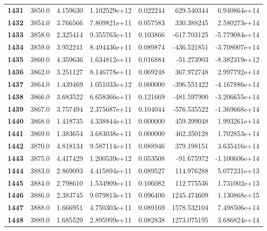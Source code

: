 \documentclass{report}[12pt]
\begin{document}
\begin{center}
\begin{tabular}{lrrrrrr}
\textbf{1431} &         3850.0 &   4.159630 &  1.102529e+12 &    0.022244 &   629.540344 &  6.940864e+14 \\
\textbf{1432} &         3854.0 &   3.766566 &  7.809821e+11 &    0.057583 &   330.388245 &  2.580273e+14 \\
\textbf{1433} &         3858.0 &   2.325414 &  9.355763e+11 &    0.103866 &  -617.703125 & -5.779084e+14 \\
\textbf{1434} &         3859.0 &   3.952241 &  8.494436e+11 &    0.089874 &  -436.521851 & -3.708007e+14 \\
\textbf{1435} &         3860.0 &   4.359636 &  1.634812e+11 &    0.016884 &   -51.273903 & -8.382319e+12 \\
\textbf{1436} &         3862.0 &   3.251127 &  8.146778e+11 &    0.069248 &   367.972748 &  2.997792e+14 \\
\textbf{1437} &         3864.0 &   1.439469 &  1.051033e+12 &    0.000000 &  -396.551422 & -4.167886e+14 \\
\textbf{1438} &         3866.0 &   3.683522 &  6.658366e+11 &    0.121669 &  -481.597900 & -3.206655e+14 \\
\textbf{1439} &         3867.0 &   3.757494 &  2.375687e+11 &    0.104044 &  -576.535522 & -1.369668e+14 \\
\textbf{1440} &         3868.0 &   1.418735 &  4.338844e+11 &    0.000000 &   459.399048 &  1.993261e+14 \\
\textbf{1441} &         3869.0 &   1.383654 &  3.683038e+11 &    0.000000 &   462.350128 &  1.702853e+14 \\
\textbf{1442} &         3870.0 &   4.818134 &  9.587114e+11 &    0.088946 &   379.198151 &  3.635416e+14 \\
\textbf{1443} &         3875.0 &   4.417429 &  1.200539e+12 &    0.053508 &   -91.675972 & -1.100606e+14 \\
\textbf{1444} &         3883.0 &   2.869093 &  4.415894e+11 &    0.089527 &   114.976288 &  5.077231e+13 \\
\textbf{1445} &         3884.0 &   2.798610 &  1.534909e+11 &    0.106082 &   112.775536 &  1.731002e+13 \\
\textbf{1446} &         3886.0 &   2.383745 &  9.079813e+11 &    0.096400 &  1245.474609 &  1.130868e+15 \\
\textbf{1447} &         3888.0 &   1.666951 &  4.750303e+11 &    0.089169 &  1578.532104 &  7.498506e+14 \\
\textbf{1448} &         3889.0 &   1.685529 &  2.895999e+11 &    0.082838 &  1273.075195 &  3.686824e+14 \\

\end{tabular}
\end{center}
\end{document}
